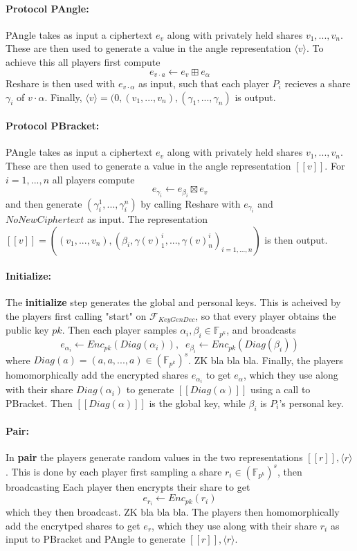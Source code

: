 \documentclass{article}
\begin{document}
\paragraph{Protocol PAngle:}
PAngle takes as input a ciphertext $e_v$ along with privately held shares $v_1, ..., v_n$. These are then used to generate a value in the angle representation $\langle v \rangle$.
To achieve this all players first compute $$e_{v \cdot a} \leftarrow e_v \boxplus e_\alpha$$
Reshare is then used with $e_{v \cdot \alpha}$ as input, such that each player $P_i$ recieves a share $\gamma_i$ of $v \cdot \alpha$. Finally, $\langle v \rangle = (0, (v_1, ..., v_n), (\gamma_1, ..., \gamma_n)$ is output.

\paragraph{Protocol PBracket:}
PAngle takes as input a ciphertext $e_v$ along with privately held shares $v_1, ..., v_n$. These are then used to generate a value in the angle representation $[\![ v ]\!]$.
For $i = 1, ..., n$ all players compute $$e_{\gamma_i} \leftarrow e_{\beta_i} \boxtimes e_v$$ and then generate $(\gamma^1_i, ..., \gamma^n_i)$ by calling Reshare with $e_{\gamma_i}$ and $NoNewCiphertext$ as input.
The representation $[\![ v ]\!] = ((v_1, ..., v_n), (\beta_i, \gamma(v)^i_1, ..., \gamma(v)^i_n)_{i = 1, ..., n})$ is then output.

\paragraph{Initialize:}
The \textbf{initialize} step generates the global and personal keys. This is acheived by the players first calling "start" on $\mathcal{F}_{KeyGenDec}$, so that every player obtains the public key $pk$.
Then each player samples $\alpha_i, \beta_i \in \mathbb{F}_{p^k}$, and broadcasts $$e_{\alpha_i} \leftarrow Enc_{pk}(Diag(\alpha_i)), \;\; e_{\beta_i} \leftarrow Enc_{pk}(Diag(\beta_i))$$ where $Diag(a) = (a, a, ..., a) \in (\mathbb{F}_{p^k})^s$. ZK bla bla bla.
Finally, the players homomorphically add the encrypted shares $e_{\alpha_i}$ to get $e_\alpha$, which they use along with their share $Diag(\alpha_i)$ to generate $[\![ Diag(\alpha) ]\!]$ using a call to PBracket. Then $[\![ Diag(\alpha) ]\!]$ is the global key, while $\beta_i$ is $P_i$'s personal key.

\paragraph{Pair:}
In \textbf{pair} the players generate random values in the two representations $[\![ r ]\!], \langle r \rangle$. This is done by each player first sampling a share $r_i \in (\mathbb{F}_{p^k})^s$, then broadcasting Each player then encrypts their share to get $$e_{r_i} \leftarrow Enc_{pk}(r_i)$$ which they then broadcast. ZK bla bla bla.
The players then homomorphically add the encrytped shares to get $e_r$, which they use along with their share $r_i$ as input to PBracket and PAngle to generate $[\![ r ]\!], \langle r \rangle$.
\end{document}
